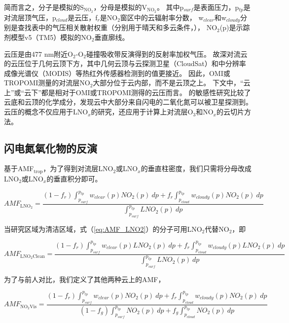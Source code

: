 简而言之，分子是模拟的S$_{\textrm{NO$_2$}}$，分母是模拟的V$_{\textrm{NO$_2$}}$。
其中p$_{surf}$是表面压力，p$_{tp}$是对流层顶气压，p$_{cloud}$是云压，f$_{r}$是NO$_2$窗区中的云辐射率分数，
w$_{clear}$和w$_{cloudy}$分别是查找表中的气压相关散射权重（分别用于晴天和多云条件，\citet{Lorente.2017}），
NO$_2$(p)是示踪剂模型v5（TM5）模拟的NO$_2$垂直廓线。

云压是由477 nm附近O$_2$-O$_2$碰撞吸收带反演得到的反射率加权气压\citep{Acarreta.2004,Sneep.2008,Stammes.2008}。
故深对流云的云压位于几何云顶下方，其中几何云顶与云探测卫星（CloudSat）和中分辨率成像光谱仪（MODIS）等热红外传感器检测到的值更接近\citep{Vasilkov.2008,Joiner.2012}。
因此，OMI或TROPOMI测量的对流层NO$_2$大部分位于云内部，而不是云顶之上。
下文中，“云上”或“云下”都是相对于OMI或TROPOMI测得的云压而言。
\citet{Beirle.2009}的敏感性研究比较了云底和云顶的化学成分，发现云中大部分来自闪电的二氧化氮可以被卫星探测到。
云压的概念不仅应用于LNO$_x$的研究，还应用于计算上对流层O$_3$和NO$_x$的云切片方法\citep{Ziemke.2009,Choi.2014,Strode.2017,Ziemke.2017,Marais.2018}。

\subsection{闪电氮氧化物的反演} \label{section:lnox}

基于AMF$_{\textrm{trop}}$，为了得到对流层LNO$_2$或LNO$_x$的垂直柱密度，我们只需将分母改成LNO$_2$或LNO$_x$的垂直积分即可。

\begin{equation} \label{eq:AMF_LNO2}
AMF_{\textrm{LNO$_2$}} = \frac{(1-f_r) \int_{p_{surf}}^{p_{tp}} w_{clear}(p) NO_2(p) \: dp + f_r \int_{p_{cloud}}^{p_{tp}} w_{cloudy}(p) NO_2(p) \: dp}{\int_{p_{surf}}^{p_{tp}} LNO_2(p) \: dp}
\end{equation}

当研究区域为清洁区域，式（\ref{eq:AMF_LNO2}）的分子可用LNO$_2$代替NO$_2$，即

\begin{equation} \label{eq:AMF_LNO2clean}
AMF_{\textrm{LNO$_2$Clean}} = \frac{(1-f_r) \int_{p_{surf}}^{p_{tp}} w_{clear}(p) LNO_2(p) \: dp + f_r \int_{p_{cloud}}^{p_{tp}} w_{cloudy}(p) LNO_2(p) \: dp}{\int_{p_{surf}}^{p_{tp}} LNO_2(p) \: dp}
\end{equation}

为了与前人对比，我们定义了其他两种云上的AMF，

\begin{equation} \label{eq:AMF_NO2Vis}
AMF_{\textrm{NO$_2$Vis}} = \frac{(1-f_r) \int_{p_{surf}}^{p_{tp}} w_{clear}(p) NO_2(p) \: dp + f_r \int_{p_{cloud}}^{p_{tp}} w_{cloudy}(p) NO_2(p) \: dp}{(1-f_g) \int_{p_{surf}}^{p_{tp}} NO_2(p) \: dp + f_g \int_{p_{cloud}}^{p_{tp}} NO_2(p) \: dp}
\end{equation}


